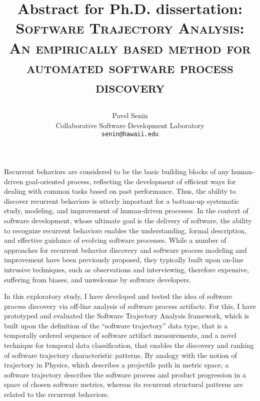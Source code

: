 \documentclass[11pt,oneside]{article}
\newcommand{\Hawaii}{Hawai`i\xspace}
\newcommand{\Manoa}{M\=anoa\xspace}
\begin{document}
\title{Abstract for Ph.D. dissertation: \\
       \textsc{Software Trajectory Analysis:} \\
       \textsc{An empirically based method for automated software process discovery} \\\vspace{-0.5em}
       \author{Pavel Senin \\
		Collaborative Software Development Laboratory \\
        \texttt{senin@hawaii.edu}
    }
    \date{}
}
\maketitle
\thispagestyle{empty}%
\vspace{-0.5em}
Recurrent behaviors are considered to be the basic building blocks of any human-driven goal-oriented process, reflecting the development of efficient ways for dealing with common tasks based on past performance. Thus, the ability to discover recurrent behaviors is utterly important for a bottom-up systematic study, modeling, and improvement of human-driven processes. In the context of software development, whose ultimate goal is the delivery of software, the ability to recognize recurrent behaviors enables the understanding, formal description, and effective guidance of evolving software processes. While a number of approaches for recurrent behavior discovery and software process modeling and improvement have been previously proposed, they typically built upon on-line intrusive techniques, such as observations and interviewing, therefore expensive, suffering from biases, and unwelcome by software developers.

In this exploratory study, I have developed and tested the idea of software process discovery via off-line analysis of software process artifacts. For this, I have prototyped and evaluated the Software Trajectory Analysis framework, which is built upon the definition of the ``software trajectory'' data type, that is a temporally ordered sequence of software artifact measurements, and a novel technique for temporal data classification, that enables the discovery and ranking of software trajectory characteristic patterns. By analogy with the notion of trajectory in Physics, which describes a projectile path in metric space, a software trajectory describes the software process and product progression in a space of chosen software metrics, whereas its recurrent structural patterns are related to the recurrent behaviors.
\end{document}
